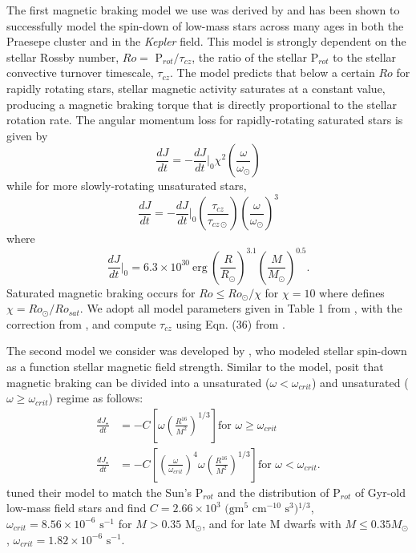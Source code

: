 \documentclass[twocolumn]{aastex61}
\newcommand{\kepler}[0]{\textit{Kepler}\xspace}
\begin{document}
The first magnetic braking model we use was derived by \citet{Matt2015} and has been shown to successfully model the spin-down of low-mass stars across many ages in both the Praesepe cluster and in the \kepler field. This model is strongly dependent on the stellar Rossby number, $Ro = $ P$_{rot}/\tau_{cz}$, the ratio of the stellar P$_{rot}$ to the stellar convective turnover timescale, $\tau_{cz}$. The \citet{Matt2015} model predicts that below a certain $Ro$ for rapidly rotating stars, stellar magnetic activity saturates at a constant value, producing a magnetic braking torque that is directly proportional to the stellar rotation rate.  The angular momentum loss for rapidly-rotating saturated stars is given by
\begin{equation} \label{eqn:mattSat}
\frac{dJ}{dt} = -\frac{dJ}{dt}\Bigg|_0 \chi^2 \left( \frac{\omega}{\omega_{\odot}} \right) 
\end{equation}
while for more slowly-rotating unsaturated stars,
\begin{equation} \label{eqn:mattUnSat}
\frac{dJ}{dt} = -\frac{dJ}{dt}\Bigg|_0 \left( \frac{\tau_{cz}}{\tau_{cz \odot}} \right) \left( \frac{\omega}{\omega_{\odot}} \right)^3 
\end{equation}
where
\begin{equation} \label{eqn:matt0}
\frac{dJ}{dt}\Bigg|_0 = 6.3 \times 10^{30} \ \mathrm{erg} \ \left( \frac{R}{R_{\odot}} \right)^{3.1} \left( \frac{M}{M_{\odot}} \right)^{0.5}.
\end{equation}
Saturated magnetic braking occurs for $Ro \leq Ro_{\odot}/\chi$ for $\chi = 10$ where \citet{Matt2015} defines $\chi = Ro_{\odot}/Ro_{sat}$.  We adopt all model parameters given in Table 1 from \citet{Matt2015}, with the correction from \citet{Matt2019}, and compute $\tau_{cz}$ using Eqn. (36) from \citet{Cranmer2011}.

The second model we consider was developed by \citet{Reiners2012}, who modeled stellar spin-down as a function stellar magnetic field strength.  Similar to the \citet{Matt2015} model, \citet{Reiners2012} posit that magnetic braking can be divided into a unsaturated ($\omega < \omega_{crit}$) and unsaturated ($\omega \geq \omega_{crit}$) regime as follows:
\begin{equation} \label{eqn:reiners}
\begin{split}
\frac{dJ_{\star}}{dt} & = -C \left[ \omega \left(\frac{R^{16}}{M^2} \right)^{1/3} \right] \text{for $\omega \geq \omega_{crit}$} \\
\frac{dJ_{\star}}{dt} & = -C \left[ \left( \frac{\omega}{\omega_{crit}} \right)^4 \omega \left(\frac{R^{16}}{M^2} \right)^{1/3} \right] \text{for $\omega < \omega_{crit}$}.
\end{split}
\end{equation}
\citet{Reiners2012} tuned their model to match the Sun's P$_{rot}$ and the distribution of P$_{rot}$ of Gyr-old low-mass field stars and find $C = 2.66 \times 10^3 \text{ (gm$^5$ cm$^{-10}$ s$^3$)$^{1/3}$}$, $\omega_{crit} = 8.56 \times 10^{-6}\text{ s$^{-1}$}$ for $M > 0.35$ M$_{\odot}$, and for late M dwarfs with $M \leq 0.35 M_{\odot}$, $\omega_{crit} = 1.82 \times 10^{-6} \text{ s$^{-1}$}$.
\end{document}
